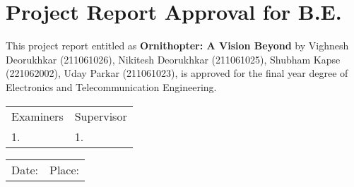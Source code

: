 \chapter*{Project Report Approval for B.E.}
\thispagestyle{empty}

This project report entitled as \textbf{Ornithopter: A Vision Beyond} by Vighnesh Deorukhkar (211061026), Nikitesh Deorukhkar (211061025), Shubham Kapse (221062002), Uday Parkar (211061023), is approved for the final year degree of Electronics and Telecommunication Engineering.

\vspace{2cm}
\begin{tabularx}{\textwidth}{X X}
    Examiners & Supervisor \\
    1. \hrulefill & 1. \hrulefill \\
\end{tabularx}

\vspace{1cm}
\begin{tabularx}{\textwidth}{X X}
    Date: \hrulefill & Place: \hrulefill \\
\end{tabularx}